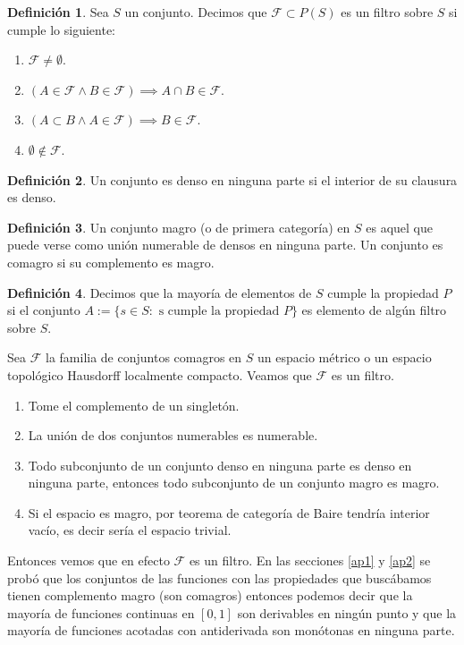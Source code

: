 \documentclass{article}
\theoremstyle{definition}
\newtheorem*{definition}{Definición}
\begin{document}
\begin{definition}
Sea $S$ un conjunto. Decimos que $\mathcal{F} \subset P(S)$ es un filtro sobre $S$ si cumple lo siguiente:
\begin{enumerate}
    \item $\mathcal{F}\neq\emptyset$.
    \item $(A\in\mathcal{F} \land B\in \mathcal{F})\implies A\cap B\in \mathcal{F}$.
    \item $(A\subset B \land A\in\mathcal{F}) \implies B\in \mathcal{F}$.
    \item $\emptyset \not\in \mathcal{F}$.
\end{enumerate}
\end{definition}
\begin{definition}
Un conjunto es denso en ninguna parte si el interior de su clausura es denso.
\end{definition}
\begin{definition}
Un conjunto magro (o de primera categoría) en $S$ es aquel que puede verse como unión numerable de densos en ninguna parte. Un conjunto es comagro si su complemento es magro.
\end{definition}
\begin{definition}
Decimos que la mayoría de elementos de $S$ cumple la propiedad $P$ si el conjunto $A:=\{s\in S: \text{ s cumple la propiedad } P\}$ es elemento de algún filtro sobre $S$. 
\end{definition}

Sea $\mathcal{F}$ la familia de conjuntos comagros en $S$ un espacio métrico o un espacio topológico Hausdorff localmente compacto. Veamos que $\mathcal{F}$ es un filtro.\\

\begin{enumerate}
\item Tome el complemento de un singletón.
\item La unión de dos conjuntos numerables es numerable.
\item Todo subconjunto de un conjunto denso en ninguna parte es denso en ninguna parte, entonces todo subconjunto de un conjunto magro es magro.
\item Si el espacio es magro, por teorema de categoría de Baire tendría interior vacío, es decir sería el espacio trivial.
\end{enumerate}

Entonces vemos que en efecto $\mathcal{F}$ es un filtro. En las secciones \ref{ap1} y \ref{ap2}  se probó que los conjuntos de las funciones con las propiedades que buscábamos tienen complemento magro (son comagros) entonces podemos decir que la mayoría de funciones continuas en $[0,1]$ son derivables en ningún punto y que la mayoría de funciones acotadas con antiderivada son monótonas en ninguna parte.
\end{document}
